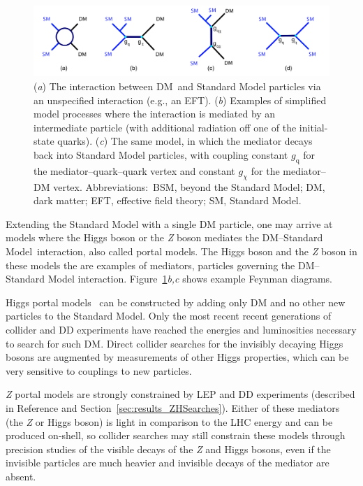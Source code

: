 \documentclass{ar-1col}
\newcommand{\chiDM}{\ensuremath{\chi}\xspace}
\newcommand{\IP}{invisible particle}
\newcommand{\gDM}{\ensuremath{g_{\chiDM}}\xspace}
\newcommand{\gdm}{\gDM}
\newcommand{\gq}{$g_{\mathrm{q}}$\xspace}
\providecommand{\DIFaddbeginFL}{} %
\providecommand{\DIFaddendFL}{} %
\begin{document}
{\begin{figure}[!htpb]
\DIFaddbeginFL \includegraphics[width=\textwidth]{figs_standalone/feynman_0}
\DIFaddendFL \caption{(\textit{a}) The interaction between DM\ and Standard Model particles via an unspecified interaction (e.g., an EFT).
(\textit{b}) Examples of simplified model processes where the interaction is mediated by an intermediate particle (with additional radiation off one of the initial-state quarks). 
(\textit{c}) The same model, in which  the mediator decays back into Standard Model particles, with coupling constant  \gq  for the mediator--quark--quark vertex and constant  \gdm for the mediator--DM vertex. 
Abbreviations:\ BSM, beyond the Standard Model; DM, dark matter; EFT, effective field theory; SM, Standard Model. \label{fig:feynman_0}}
\end{figure}

Extending the Standard Model with a single DM particle, one
may arrive at models where the Higgs boson or the \textit{Z} boson mediates
the DM--Standard Model\  interaction, also called portal models. 
The Higgs boson and the \textit{Z} boson in these models the are examples of {mediators}, 
particles governing the DM--Standard Model interaction. 
Figure~\ref{fig:feynman_0}\textit{b,c} shows example Feynman diagrams.

{Higgs portal} models~\cite{Patt:2006fw,Djouadi:2011aa} can be constructed by adding only DM and no other new particles to the Standard Model. 
Only the most recent recent generations of collider and DD
experiments have reached the energies and luminosities necessary to
search for such DM. Direct collider searches for the
invisibly decaying Higgs bosons are augmented by measurements of
other Higgs properties, which can be very sensitive to couplings
to new particles.

{\textit{Z} portal} models are strongly constrained
by LEP and DD experiments (described in Reference  and Section~\ref{sec:results_ZHSearches}). 
Either of these mediators (the \textit{Z} or Higgs boson) is light in
comparison to the LHC energy and can be produced on-shell, so
collider searches may still constrain these models 
through precision studies of the visible decays of the \textit{Z} and Higgs bosons, 
even if the {\IP}s are much heavier and invisible decays of the mediator
are absent. 

}
\end{document}

